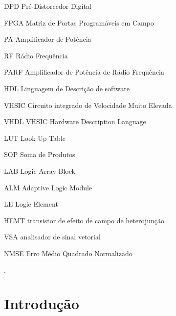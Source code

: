 \documentclass[
	12pt,				%
	openright,			%
	oneside,			%
	a4paper,			%
	brazil				%
	]{abntex2}
\begin{document}
\begin{siglas}  %
 \item[DPD]  Pré-Distorcedor Digital
 \item[FPGA] Matriz de Portas Programáveis em Campo 
 \item[PA] Amplificador de Potência
 \item[RF] Rádio Frequência 
 \item[PARF] Amplificador de Potência de Rádio Frequência 
 \item[HDL] Linguagem de Descrição de software
 \item[VHSIC]  Circuito integrado de Velocidade Muito Elevada 
 \item[VHDL]  VHSIC Hardware Description Language
 \item[LUT]  Look Up Table
 \item[SOP]  Soma de Produtos 
 \item[LAB]  Logic Array Block 
 \item[ALM]  Adaptive Logic Module
 \item[LE]   Logic Element 
 \item[HEMT] transistor de efeito de campo de heterojunção
 \item[VSA] analisador de sinal vetorial  
 \item[NMSE] Erro Médio Quadrado Normalizado
\end{siglas}


\begin{resumo}

	
	.
	\end{resumo}

	
\listoffigures*
\cleardoublepage
\tableofcontents*
\cleardoublepage



\textual

\setcounter{page}{1}

\chapter{Introdução} 
\label{chap:introducao}

\end{document}
